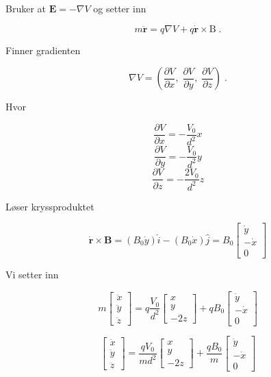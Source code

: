 \documentclass[reprint,english,notitlepage, nofootinbib]{revtex4-1}  %
\begin{document}
Bruker at $\mathbf{E} = -\nabla{V}$ og setter inn

$$m \ddot{\mathbf{r}} = q \nabla{V} + q \dot{\mathbf{r}} \times\mathrm{B} \; .$$

Finner gradienten

$$\nabla{V} = \left ( \frac{\partial V}{\partial x}, \; \frac{\partial V}{\partial y}, \; \frac{\partial V}{\partial z} \right ) \; .$$

Hvor

$$ \frac{\partial V}{\partial x} = -\frac{V_0}{d^2}x$$
$$ \frac{\partial V}{\partial y} = - \frac{V_0}{d^2}y$$
$$ \frac{\partial V}{\partial z} = - \frac{2V_0}{d^2}z$$

Løser kryssproduktet

$$\dot{\mathbf{r}} \times \mathbf{B} = (B_0 \dot{y})\hat{i} - (B_0\dot{x})\hat{j} = B_0 \begin{bmatrix}
\dot{y} \\ -\dot{x} \\ 0
\end{bmatrix}$$

Vi setter inn

$$ m \begin{bmatrix} \ddot{x} \\ \ddot{y} \\ \ddot{z} \end{bmatrix} = q \frac{V_0}{d^2} \begin{bmatrix}
x \\ y \\ -2z 
\end{bmatrix} + q B_0 \begin{bmatrix}
\dot{y} \\ -\dot{x} \\ 0
\end{bmatrix}$$

$$\begin{bmatrix} \ddot{x} \\ \ddot{y} \\ \ddot{z} \end{bmatrix} = \frac{qV_0}{md^2} \begin{bmatrix}
x \\ y \\ -2z 
\end{bmatrix} + \frac{qB_0}{m} \begin{bmatrix}
\dot{y} \\ -\dot{x} \\ 0
\end{bmatrix}$$ 
\end{document}
